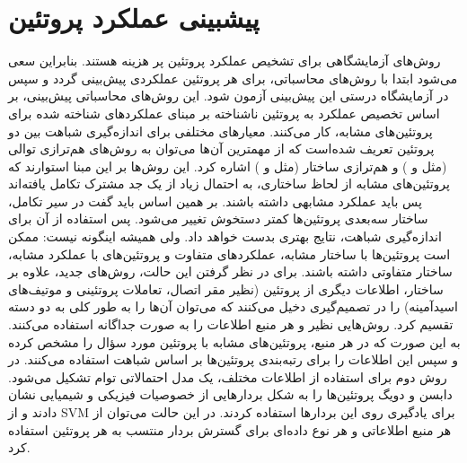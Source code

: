 \section{پیشبینی عملکرد پروتئین}\label{sec:protein-function-prediction-review}
 روش‌های آزمایشگاهی برای تشخیص عملکرد پروتئین پر هزینه هستند. بنابراین سعی می‌شود ابتدا با روش‌های محاسباتی، برای هر پروتئین عملکردی پیش‌بینی گردد و سپس در آزمایشگاه درستی این پیش‌بینی آزمون شود. این روش‌های محاسباتی پیش‌بینی، بر اساس تخصیص عملکرد به پروتئین ناشناخته بر مبنای عملکردهای شناخته شده برای پروتئین‌های مشابه، کار می‌کنند. معیارهای مختلفی برای اندازه‌گیری شباهت بین دو پروتئین تعریف شده‌است که از مهمترین آن‌ها می‌توان به روش‌های هم‌ترازی توالی (مثل  و ) و هم‌ترازی ساختار (مثل  و ) اشاره کرد. این روش‌ها بر این مبنا استوارند که پروتئین‌های مشابه از لحاظ ساختاری، به احتمال زیاد از یک جد مشترک تکامل یافته‌اند پس باید عملکرد مشابهی داشته باشند. بر همین اساس باید گفت در سیر تکامل، ساختار سه‌بعدی پروتئین‌ها کمتر دستخوش تغییر می‌شود. پس استفاده از آن برای اندازه‌گیری شباهت، نتایج بهتری بدست خواهد داد. ولی همیشه اینگونه نیست: ممکن است پروتئین‌ها با ساختار مشابه، عملکردهای متفاوت و پروتئین‌های با عملکرد مشابه، ساختار متفاوتی داشته باشند. برای در نظر گرفتن این حالت، روش‌های جدید، علاوه بر ساختار، اطلاعات دیگری از پروتئین (نظیر مقر اتصال، تعاملات پروتئینی و موتیف‌های اسیدآمینه) را در تصمیم‌گیری دخیل می‌کنند که می‌توان آن‌ها را به طور کلی به دو دسته تقسیم کرد. روش‌هایی نظیر  و  هر منبع اطلاعات را به صورت جداگانه استفاده می‌کنند. به این صورت که در هر منبع، پروتئین‌های مشابه با پروتئین مورد سؤال را مشخص کرده و سپس این اطلاعات را برای رتبه‌بندی پروتئین‌ها بر اساس شباهت استفاده می‌کنند. در روش دوم برای استفاده از اطلاعات مختلف، یک مدل احتمالاتی توام تشکیل می‌شود. دابسن و دویگ  پروتئین‌ها را به شکل بردارهایی از خصوصیات فیزیکی و شیمیایی نشان دادند و از SVM برای یادگیری روی این بردارها استفاده کردند. در این حالت می‌توان از هر منبع اطلاعاتی و هر نوع داده‌ای برای گسترش بردار منتسب به هر پروتئین استفاده کرد.

